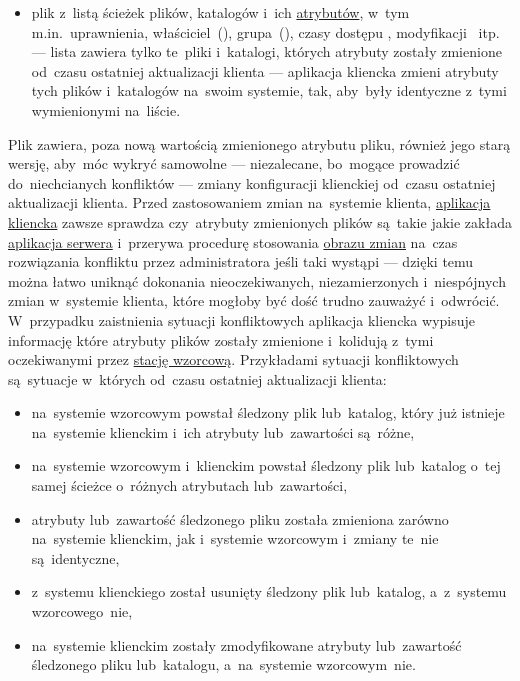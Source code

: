 \documentclass[thesis]{subfiles}
\begin{document}
\begin{itemize}
	\item plik  z~listą ścieżek plików, katalogów i~ich \href{https://serverfault.com/a/584102/289017}{atrybutów}, w~tym m.in.~uprawnienia, właściciel~(), grupa~(), czasy dostępu , modyfikacji ~itp. --- lista zawiera tylko te~pliki i~katalogi, których atrybuty zostały zmienione od~czasu ostatniej aktualizacji klienta --- aplikacja kliencka zmieni atrybuty tych plików i~katalogów na~swoim systemie, tak, aby~były identyczne z~tymi wymienionymi na~liście.
\end{itemize}

Plik  zawiera, poza nową wartością zmienionego atrybutu pliku, również jego starą wersję, aby~móc wykryć samowolne --- niezalecane, bo~mogące prowadzić do~niechcianych konfliktów --- zmiany konfiguracji klienckiej od~czasu ostatniej aktualizacji klienta. Przed zastosowaniem zmian na~systemie klienta, \hyperref[sec:cli-app]{aplikacja kliencka} zawsze sprawdza czy~atrybuty zmienionych plików są~takie jakie zakłada \hyperref[sec:srv-app]{aplikacja serwera} i~przerywa procedurę stosowania \hyperref[sec:obraz-zmian-konfiguracji]{obrazu zmian} na~czas rozwiązania konfliktu przez administratora jeśli taki wystąpi --- dzięki temu można łatwo uniknąć dokonania nieoczekiwanych, niezamierzonych i~niespójnych zmian w~systemie klienta, które mogłoby być dość trudno zauważyć i~odwrócić. W~przypadku zaistnienia sytuacji konfliktowych aplikacja kliencka wypisuje informację które atrybuty plików zostały zmienione i~kolidują z~tymi oczekiwanymi przez \hyperref[sec:srv-app]{stację wzorcową}. Przykładami sytuacji konfliktowych są~sytuacje w~których od~czasu ostatniej aktualizacji klienta:\mynobreakpar
\begin{itemize}
	\item na~systemie wzorcowym powstał śledzony plik lub~katalog, który już istnieje na~systemie klienckim i~ich atrybuty lub~zawartości są~różne,
	\item na~systemie wzorcowym i~klienckim powstał śledzony plik lub~katalog o~tej samej ścieżce o~różnych atrybutach lub~zawartości,
	\item atrybuty lub~zawartość śledzonego pliku została zmieniona zarówno na~systemie klienckim, jak i~systemie wzorcowym i~zmiany te~nie są~identyczne,
	\item z~systemu klienckiego został usunięty śledzony plik lub~katalog, a~z~systemu wzorcowego~nie,
	\item na~systemie klienckim zostały zmodyfikowane atrybuty lub~zawartość śledzonego pliku lub~katalogu, a~na~systemie wzorcowym~nie.
\end{itemize}
\end{document}

